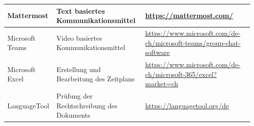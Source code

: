 \begin{longtable}{|p{}|p{}|p{}|}
    Mattermost                       & Text basiertes Kommunikationsmittel                & \url{https://mattermost.com/}                                             \\ \hline
    Microsoft Teams                  & Video basiertes Kommunikationsmittel               & \url{https://www.microsoft.com/de-ch/microsoft-teams/group-chat-software} \\ \hline
    Microsoft Excel                  & Erstellung und Bearbeitung des Zeitplans           & \url{https://www.microsoft.com/de-ch/microsoft-365/excel?market=ch}       \\ \hline
    LanguageTool                  	 & Prüfung der Rechtschreibung des Dokuments          & \url{https://languagetool.org/de}       								  \\ \hline
\end{longtable}
\renewcommand{\arraystretch}{1}
\newpage